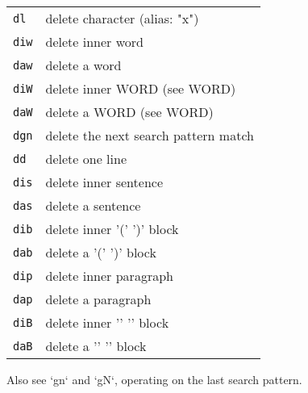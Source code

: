 \begin{tabular}{@{}ll@{}}
    \verb!dl!       & delete character (alias: "x") \\
    \verb!diw!      & delete inner word \\
    \verb!daw!      & delete a word \\
    \verb!diW!      & delete inner WORD (see WORD) \\
    \verb!daW!      & delete a WORD (see WORD) \\
    \verb!dgn!      & delete the next search pattern match \\
    \verb!dd!       & delete one line \\
    \verb!dis!      & delete inner sentence \\
    \verb!das!      & delete a sentence \\
    \verb!dib!      & delete inner '(' ')' block \\
    \verb!dab!      & delete a '(' ')' block \\
    \verb!dip!      & delete inner paragraph \\
    \verb!dap!      & delete a paragraph \\
    \verb!diB!      & delete inner '{' '}' block \\
    \verb!daB!      & delete a '{' '}' block \\
\end{tabular}

Also see `gn` and `gN`, operating on the last search pattern.
